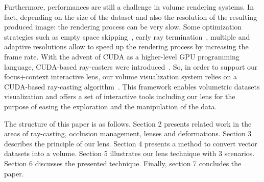 Furthermore, performances are still a  challenge in volume rendering systems. In fact, depending on the size of the dataset and also the resolution of the resulting produced image: the rendering process can be very slow. Some optimization strategies such as empty space skipping~\cite{Liu:2009:AVR:2421899.2421919}, early ray termination~\cite{CGF:CGF12605}, multiple and adaptive resolutions allow to speed up the rendering process by increasing the frame rate. With the advent of CUDA as a higher-level GPU programming language, CUDA-based ray-casters were introduced~\cite{Kainz:2009:RCM:1661412.1618498}. So, in order to support our focus+context interactive lens, our volume visualization system relies on a CUDA-based ray-casting algorithm~\cite{Roettger:2003:SHV:769922.769948}.  This framework enables volumetric datasets visualization and offers a set of interactive tools including our lens for the purpose of easing the exploration and the manipulation of the data.

The structure of this paper is as follows. Section 2 presents related work in the areas of ray-casting, occlusion management, lenses and deformations. Section 3 describes the principle of our lens. Section 4 presents a method to convert vector datasets into a volume. Section 5 illustrates our lens technique with 3 scenarios. Section 6 discusses the presented technique. Finally, section 7 concludes the paper. 